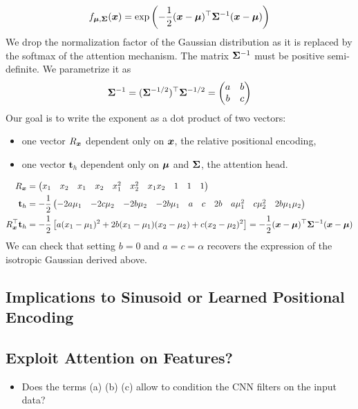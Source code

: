 \documentclass{article} %
\begin{document}
\begin{align}
  f_{{\bm{\mu}}, {\bm{\Sigma}}}({\bm{x}}) = \exp \left(
    - \frac 1 2
    ({\bm{x}} - {\bm{\mu}})^\top {\bm{\Sigma}}^{-1} ({\bm{x}} - {\bm{\mu}})
  \right)
\end{align}
We drop the normalization factor of the Gaussian distribution as it is replaced by the softmax of the attention mechanism.
The matrix ${\bm{\Sigma}}^{-1}$ must be positive semi-definite.
We parametrize it as 
\begin{align}
  {\bm{\Sigma}}^{-1} = ({\bm{\Sigma}}^{-1/2})^\top{\bm{\Sigma}}^{-1/2} = \begin{pmatrix}a & b \\ b & c\end{pmatrix}  
\end{align}
Our goal is to write the exponent as a dot product of two vectors:
\begin{itemize}
  \item one vector $R_{\bm{x}}$ dependent only on ${\bm{x}}$, the relative positional encoding,
  \item one vector $\mathbf{t}_h$ dependent only on ${\bm{\mu}}$ and ${\bm{\Sigma}}$, the attention head.
\end{itemize}
\begin{align}
  R_{\bm{x}} &= 
  \begin{pmatrix}
    x_1      & x_2       & x_1      & x_2      & x_1^2   & x_2^2 & x_1 x_2 & 1        & 1         & 1
  \end{pmatrix}\\
  \mathbf{t}_h &= -\frac{1}{2}
  \begin{pmatrix}
    -2a\mu_1 & -2c \mu_2 & -2b\mu_2 & -2b\mu_1 & a       & c     & 2b      & a\mu_1^2 & c\mu_2^2 & 2b\mu_1 \mu_2
  \end{pmatrix}\\
  R_{\bm{x}}^\top \mathbf{t}_h &=
  -\frac{1}{2} 
  \left[
  a(x_1 - \mu_1)^2 + 2b(x_1-\mu_1)(x_2 -\mu_2) + c(x_2-\mu_2)^2 
  \right]
  = - \frac 1 2 ({\bm{x}} - {\bm{\mu}})^\top {\bm{\Sigma}}^{-1} ({\bm{x}} - {\bm{\mu}})
\end{align}
We can check that setting $b = 0$ and $a=c=\alpha$ recovers the expression of the isotropic Gaussian derived above.

\subsection{Implications to Sinusoid or Learned Positional Encoding} 


\subsection{Exploit Attention on Features?} 
\begin{itemize}

  \item Does the terms (a) (b) (c) allow to condition the CNN filters on the input data?
\end{itemize}
\end{document}
